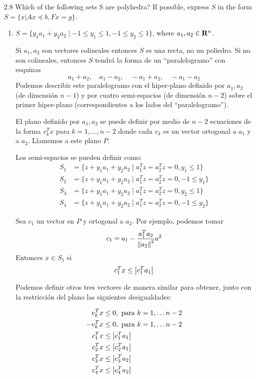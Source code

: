 
\begin{enunciado}{2.8}
    2.8 Which of the following sets S are polyhedra?
    If possible, express $S$ in the form $S = \{x | Ax \preceq b, Fx = g\}$.
\end{enunciado}

\begin{enumerate}[label=(\alph*)]
\item $S = \{y_1a_1 + y_2a_2 \mid −1 \leq y_1 \leq 1, −1 \leq y_2 \leq 1\}$, where $a_1,a_2 \in \mathbf{R}^n$.

    Si $a_1, a_2$ son vectores colineales entonces $S$ es una recta, no un poliedro.
    Si no son colineales, entonces $S$ tendrá la forma de un ``paralelogramo'' con esquinas
    \[a_1 + a_2,\quad
        a_1 - a_2,\quad
        -a_1 + a_2,\quad
    -a_1 - a_2\]
    Podemos describir este paralelogramo con el hiper-plano definido por $a_1,a_2$ (de dimensión $n-1$) y
    por cuatro semi-espacios (de dimensión $n-2$) sobre el primer hiper-plano (correspondientes a los lados del ``paralelogramo'').

    El plano definido por $a_1,a_2$ se puede definir por medio de $n-2$ ecuaciones
    de la forma $v_k^Tx$ para $k=1,\dots, n-2$ donde cada $v_k$ es un vector ortogonal a $a_1$ y a $a_2$.
    Llamemos a este plano $P$.

    Los semi-espacios se pueden definir como:
    \begin{align*}
        S_1 &= \{z + y_1 a_1 + y_2 a_2 \mid a^T_1 z = a^T_2 z = 0, y_1 \leq 1     \} \\
        S_2 &= \{z + y_1 a_1 + y_2 a_2 \mid a^T_1 z = a^T_2 z = 0, -1  \leq y_1   \} \\
        S_3 &= \{z + y_1 a_1 + y_2 a_2 \mid a^T_1 z = a^T_2 z = 0, y_2 \leq 1     \} \\
        S_4 &= \{z + y_1 a_1 + y_2 a_2 \mid a^T_1 z = a^T_2 z = 0, -1  \leq y_2   \}
    \end{align*}

    Sea $c_1$ un vector en $P$ y ortogonal a $a_2$. Por ejemplo, podemos tomar
    \[ c_1 = a_1 - \frac{a_1^T a_2}{\norm{a_2}^2} a^2 \]
    Entonces $x\in S_1$ si
    \[ c_1^T x \leq \abs{c_1^T a_1} \]

    Podemos definir otros tres vectores de manera similar para obtener, junto con
    la restricción del plano las siguientes desigualdades:

    \begin{align*}
        v_k^T x  &\leq 0, \text{ para } k = 1,\dots n-2 \\
        -v_k^T x &\leq 0, \text{ para } k = 1,\dots n-2 \\
        c_1^T x  &\leq \abs{c_1^Ta_1} \\
        c_2^T x  &\leq \abs{c_2^Ta_1} \\
        c_3^T x  &\leq \abs{c_3^Ta_2} \\
        c_4^T x  &\leq \abs{c_4^Ta_2}
    \end{align*}


\end{enumerate}
